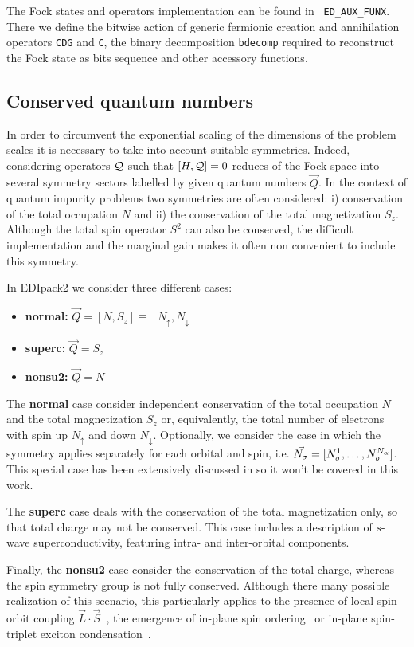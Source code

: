 \documentclass[final,3p,10pt]{elsarticle}
\newcommand{\onlinecite}[1]{\nocite{#1}\hspace{-0.1cm}\citenum{#1}}
\def\a{\alpha}       \def\b{\beta}   \def\g{\gamma}   \def\d{\delta}
\def\up{\uparrow} \def\down{\downarrow} \def\dw{\downarrow}
\def\NAME{{\rm EDIpack2 }}
\begin{document}
The Fock states and operators implementation can be found in {\tt
  ED\_AUX\_FUNX}. There we define the bitwise action of generic fermionic creation
and annihilation operators {\tt CDG} and {\tt C}, the binary
decomposition {\tt bdecomp} required to reconstruct the Fock state as
bits sequence and other accessory functions. 

\subsection{Conserved quantum numbers}\label{sSecQNs}
In order to circumvent the exponential scaling of the dimensions of
the problem scales it is necessary to take into account suitable symmetries.
Indeed, considering operators ${\cal Q}$ such that $[H, {\cal Q}]=0$
reduces of the Fock space into several symmetry sectors
labelled by given quantum numbers $\vec{Q}$. 
In the context of quantum impurity problems two symmetries are often considered: i)
conservation of the total occupation $N$ and ii) the
conservation of the total magnetization $S_z$. Although the total spin
operator $S^2$ can also be conserved, the difficult  implementation
and the marginal gain makes it often non convenient to include this symmetry.

In \NAME we consider three different cases:
\begin{itemize}
\item{\bf normal:}  $\vec{Q}=[N,S_z]\equiv[N_\up,N_\dw]$
\item{\bf superc:}  $\vec{Q}=S_z$
\item{\bf nonsu2:} $\vec{Q}=N$
\end{itemize}

The {\bf normal} case consider independent conservation of the total occupation $N$
and the total magnetization $S_z$ or, equivalently, the total number of electrons with spin up $N_\up$ and down
$N_\dw$. Optionally, we consider the case in which the symmetry
applies separately for each orbital and spin,
i.e. $\vec{N_\s}=[N^1_\s,\dots,N^{N_\a}_\s]$. This special case has been
extensively discussed in \onlinecite{Amaricci2022} so it won't be covered in
this work.

The {\bf superc} case deals with the conservation of the total
magnetization only, so that total charge may not be conserved. This
case includes a description of $s$-wave superconductivity, featuring
intra- and inter-orbital components.

Finally, the {\bf nonsu2} case consider the conservation of the total
charge, whereas the spin symmetry group is not fully
conserved. Although there many possible realization of this scenario,
this particularly applies to the presence of local spin-orbit coupling
$\vec{L}\cdot\vec{S}$~\cite{something}, the emergence of in-plane spin ordering~\cite{KM} or
in-plane spin-triplet exciton condensation~\cite{ExcitonPRB,Amaricci,Blason}.  
\end{document}
